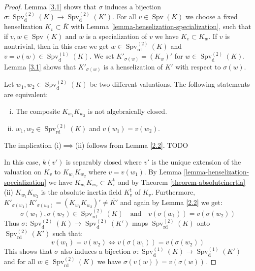 \begin{proof}
Lemma \ref{3.1} shows that $\sigma$ induces a bijection $\sigma: \operatorname{Spv}_\text{d}^{(2)}(K)\to \operatorname{Spv}_\text{d}^{(2)}(K')$. For all $v\in\operatorname{Spv}(K)$ we choose a fixed henselization $K_v\subset\overline{K}$ with Lemma \ref{lemma-henselization-specialization}, such that if $v,w\in\operatorname{Spv}(K)$ and $w$ is a specialization of $v$ we have $K_v\subset K_w$. If $v$ is nontrivial, then in this case we get $w\in\operatorname{Spv}_\text{rd}^{(2)}(K)$ and $v=v(w)\in\operatorname{Spv}_\text{d}^{(1)}(K)$. We set $K'_{\sigma(w)} = (K_w)'$ for $w\in\operatorname{Spv}_\text{d}^{(2)}(K)$. Lemma \ref{3.1} shows that $K'_{\sigma(w)}$ is a henselization of $K'$ with respect to $\sigma(w)$.

Let $w_1,w_2 \in\operatorname{Spv}_\text{d}^{(2)}(K)$ be two different valuations. The following statements are equivalent:
\begin{enumerate}[(i)]
\item The composite $K_{w_1}K_{w_2}$ is not algebraically closed.
\item $w_1,w_2\in\operatorname{Spv}_\text{rd}^{(2)}(K)$ and $v(w_1) = v(w_2)$.
\end{enumerate}
The implication (i)$\implies$(ii) follows from Lemma \ref{2.2}. TODO

In this case, $k(v')$ is separably closed where $v'$ is the unique extension of the valuation on $K_v$ to $K_{w_1}K_{w_2}$ where $v=v(w_1)$. By Lemma \ref{lemma-henselization-specialization} we have $K_{w_1}K_{w_2}\subset K_v^\text{t}$ and by Theorem \ref{theorem-absoluteinertia} (ii) $K_{w_1}K_{w_2}$ is the absolute inertia field $K_v^\text{t}$ of $K_v$. Furthermore, $K'_{\sigma(w_1)}K'_{\sigma(w_2)} = (K_{w_1}K_{w_2})' \neq \overline{K'}$ and again by Lemma \ref{2.2} we get: \[\sigma(w_1),\sigma(w_2)\in\operatorname{Spv}_\text{rd}^{(2)}(K)\quad \text{and} \quad v(\sigma(w_1)) = v(\sigma(w_2))\]
Thus $\sigma: \operatorname{Spv}_\text{d}^{(2)}(K)\to \operatorname{Spv}_\text{d}^{(2)}(K')$ maps $\operatorname{Spv}_\text{rd}^{(2)}(K)$ onto $\operatorname{Spv}_\text{rd}^{(2)}(K')$ such that:
\[ v(w_1)=v(w_2) \iff v(\sigma(w_1)) = v(\sigma(w_2)) \]
This shows that $\sigma$ also induces a bijection $\sigma:\operatorname{Spv}_\text{d}^{(1)}(K)\to\operatorname{Spv}_\text{d}^{(1)}(K')$ and for all $w\in\operatorname{Spv}_\text{rd}^{(2)}(K)$ we have $\sigma(v(w)) = v(\sigma(w))$.


\end{proof}
